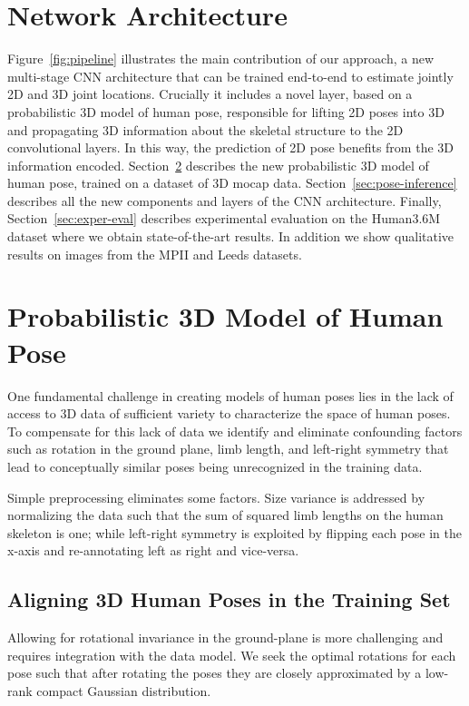 \documentclass[10pt,twocolumn,letterpaper]{article}
\begin{document}
\section{Network Architecture}

Figure~\ref{fig:pipeline} illustrates the main contribution of our
approach, a new multi-stage CNN architecture that can be trained
end-to-end to estimate jointly 2D and 3D joint locations. Crucially it
includes a novel layer, based on a probabilistic 3D model of human
pose, responsible for lifting 2D poses into 3D and propagating 3D
information about the skeletal structure to the 2D convolutional
layers. In this way, the prediction of 2D pose benefits from the 3D
information encoded. Section~\ref{sec:modeling-3D-poses} describes the
new probabilistic 3D model of human pose, trained on a dataset of 3D
mocap data. Section~\ref{sec:pose-inference} describes all the new
components and layers of the  CNN architecture. Finally,
Section~\ref{sec:exper-eval} describes experimental evaluation on
the Human3.6M dataset where we obtain state-of-the-art results. In
addition we show qualitative results on images from the MPII and Leeds datasets.

\section{Probabilistic 3D Model of Human Pose}
\label{sec:modeling-3D-poses}

One fundamental challenge in creating models of human poses lies in
the lack of access to 3D data of sufficient variety to characterize
the space of human poses. To compensate for this lack of data
we identify and eliminate confounding factors such as rotation in the
ground plane, limb length, and left-right symmetry that lead to
conceptually similar poses being unrecognized in the training data.


Simple preprocessing eliminates some factors. Size variance is addressed by
normalizing the data such that the sum of squared limb lengths on the human
skeleton is one; while left-right symmetry is exploited by flipping each pose in
the x-axis and re-annotating left as right and vice-versa.

\subsection{Aligning 3D Human Poses in the Training Set}
\label{sec:aligning-non-rigid}

Allowing for rotational invariance in the ground-plane is more
challenging and requires integration with the  data model. We seek the
optimal rotations for each pose such that after rotating the poses
they are closely approximated by a low-rank compact Gaussian
distribution.%
\end{document}
